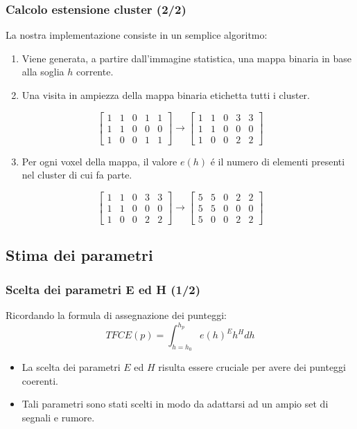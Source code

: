\documentclass{beamer}
\begin{document}
\begin{frame}
\frametitle{Calcolo estensione cluster (2/2)}
La nostra implementazione consiste in un semplice algoritmo:
\begin{enumerate}
\item Viene generata, a partire dall'immagine statistica, una mappa binaria in base alla soglia $h$ corrente.
\item Una visita in ampiezza della mappa binaria etichetta tutti i cluster.
\end{enumerate}
\[
\begin{bmatrix}
    1       & 1 & 0 & 1 & 1\\
    1       & 1 & 0 & 0 & 0 \\
    1       & 0 & 0 & 1 & 1
\end{bmatrix}
\rightarrow
\begin{bmatrix}
    1       & 1 & 0 & 3 & 3\\
    1       & 1 & 0 & 0 & 0 \\
    1       & 0 & 0 & 2 & 2
\end{bmatrix}
\]
\begin{enumerate}
\setcounter{enumi}{2}
\item Per ogni voxel della mappa, il valore $e(h)$ \'e il numero di elementi presenti nel cluster di cui fa parte.
\end{enumerate}
\[
\begin{bmatrix}
    1       & 1 & 0 & 3 & 3\\
    1       & 1 & 0 & 0 & 0 \\
    1       & 0 & 0 & 2 & 2
\end{bmatrix}
\rightarrow
\begin{bmatrix}
    5       & 5 & 0 & 2 & 2 \\
    5       & 5 & 0 & 0 & 0 \\
    5       & 0 & 0 & 2 & 2
\end{bmatrix}
\]

\end{frame}

\subsection{Stima dei parametri}

\begin{frame}
\frametitle{Scelta dei parametri E ed H (1/2)}
Ricordando la formula di assegnazione dei punteggi:
$$TFCE(p)=\int_{h=h_0}^{h_p}e(h)^E h^H dh$$
\begin{itemize}
\item La scelta dei parametri $E$ ed $H$ risulta essere cruciale per avere dei punteggi coerenti.

\item Tali parametri sono stati scelti in modo da adattarsi ad un ampio set di segnali e rumore.

\end{itemize}
\end{frame}
\end{document}
